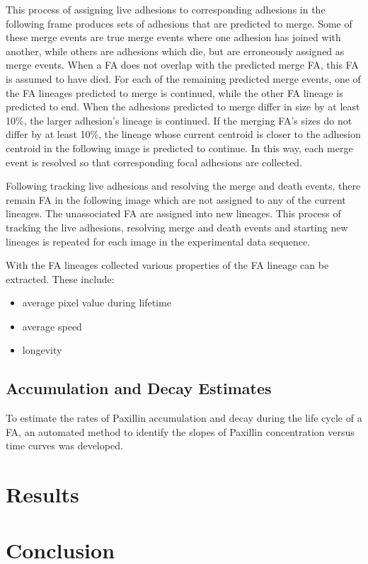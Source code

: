 \documentclass[letterpaper,twocolumn]{article}
\begin{document}
This process of assigning live adhesions to corresponding adhesions in the following frame produces sets of adhesions that are predicted to merge. Some of these merge events are true merge events where one adhesion has joined with another, while others are adhesions which die, but are erroneously assigned as merge events. When a FA does not overlap with the predicted merge FA, this FA is assumed to have died. For each of the remaining predicted merge events, one of the FA lineages predicted to merge is continued, while the other FA lineage is predicted to end. When the adhesions predicted to merge differ in size by at least 10\%, the larger adhesion's lineage is continued. If the merging FA's sizes do not differ by at least 10\%, the lineage whose current centroid is closer to the adhesion centroid in the following image is predicted to continue. In this way, each merge event is resolved so that corresponding focal adhesions are collected.

Following tracking live adhesions and resolving the merge and death events, there remain FA in the following image which are not assigned to any of the current lineages. The unassociated FA are assigned into new lineages. This process of tracking the live adhesions, resolving merge and death events and starting new lineages is repeated for each image in the experimental data sequence.

With the FA lineages collected various properties of the FA lineage can be extracted. These include:

\begin{itemize}
\item average pixel value during lifetime
\item average speed
\item longevity
\end{itemize}

\subsection*{Accumulation and Decay Estimates}

To estimate the rates of Paxillin accumulation and decay during the life cycle of a FA, an automated method to identify the slopes of Paxillin concentration versus time curves was developed. 

\section*{Results}

\section*{Conclusion}

{}

\end{document}
